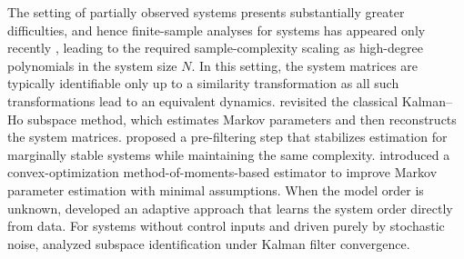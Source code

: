 \documentclass[11pt]{article}
\DeclareMathOperator{\eig}{eig}
\begin{document}
The setting of partially observed systems presents substantially greater difficulties, and hence finite-sample analyses for  systems has appeared only recently \cite{oymak2021revisiting,simchowitz2019learning,sarkar2021finite,tsiamis2019finite,bakshi2023new}, leading to the required sample-complexity scaling as high-degree polynomials in the system size $N$. In this setting, the system matrices are typically identifiable only up to a similarity transformation as all such transformations lead to an equivalent dynamics. \cite{oymak2021revisiting} revisited the classical Kalman–Ho subspace method, which estimates Markov parameters and then reconstructs the system matrices. \cite{simchowitz2019learning} proposed a pre-filtering step that stabilizes estimation for marginally stable systems while maintaining the same complexity. \cite{bakshi2023new} introduced a convex-optimization method-of-moments-based estimator to improve Markov parameter estimation with minimal assumptions. When the model order is unknown, \cite{sarkar2021finite} developed an adaptive approach that learns the system order directly from data. For systems without control inputs and driven purely by stochastic noise, \cite{tsiamis2019finite} analyzed subspace identification under Kalman filter convergence.


\end{document}
